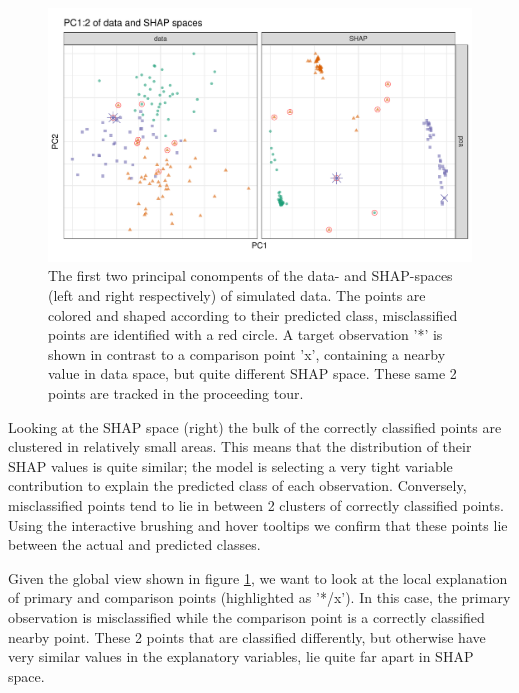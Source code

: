 \documentclass{template/monashthesis}
\begin{document}
\begin{figure}

{\centering \includegraphics[width=1\linewidth,]{./figures_from_script/ch5_fig2_global_space} 

}

\caption{The first two principal conompents of the data- and SHAP-spaces (left and right respectively) of simulated data. The points are colored and shaped according to their predicted class, misclassified points are identified with a red circle. A target observation '*' is shown in contrast to a comparison point 'x', containing a nearby value in data space, but quite different SHAP space. These same 2 points are tracked in the proceeding tour.}\label{fig:ch5fig2}
\end{figure}

Looking at the SHAP space (right) the bulk of the correctly classified points are clustered in relatively small areas. This means that the distribution of their SHAP values is quite similar; the model is selecting a very tight variable contribution to explain the predicted class of each observation. Conversely, misclassified points tend to lie in between 2 clusters of correctly classified points. Using the interactive brushing and hover tooltips we confirm that these points lie between the actual and predicted classes.

Given the global view shown in figure \ref{fig:ch5fig2}, we want to look at the local explanation of primary and comparison points (highlighted as '*/x'). In this case, the primary observation is misclassified while the comparison point is a correctly classified nearby point. These 2 points that are classified differently, but otherwise have very similar values in the explanatory variables, lie quite far apart in SHAP space.
\end{document}

